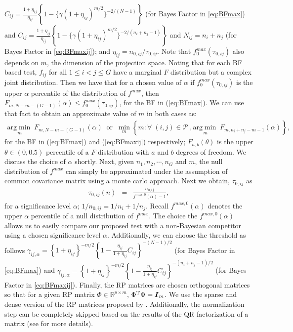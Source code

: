 \documentclass[12pt]{article}
\theoremstyle{plain}%
\theoremstyle{definition}
\def\be{\begin{eqnarray}}
\def\ee{\end{eqnarray}}
\def\trans{^{\rm T}}
\newcommand{\uF}       {\mbox{\boldmath$F$}}
\newcommand{\uI}       {\mbox{\boldmath$I$}}
\begin{document}
$C_{ij} = \frac{1+\eta_{ij}}{\eta_{ij}}\left\{ 1 - \{\gamma(1+\eta_{ij})^{m/2} \}^{-2/(N-1)}  \right\}$ (for Bayes Factor in \ref{eq:BFmax}) and $C_{ij} = \frac{1+\eta_{ij}}{\eta_{ij}}\left\{ 1 - \{\gamma(1+\eta_{ij})^{m/2} \}^{-2/(n_i+n_j-1)}  \right\}$ and $N_{ij} = n_i +n_j$ (for Bayes Factor in \ref{eq:BFmaxij}); and $\eta_{ij} = n_{0,ij}/\tau_{0,ij}$. Note that $f^{max}_{0}(\tau_{0,ij})$ also depends on $m$, the dimension of the projection space. Noting that for each BF based test, $f_{ij}$ for all $1 \leq i < j \leq G$ have a marginal $F$ distribution but a complex joint distribution. Then we have that for a chosen value of $\alpha$ if $f^{max}_{0}(\tau_{0,ij})$ is the upper $\alpha$ percentile of the distribution of $f^{max}$, then $F_{m, N-m-(G-1)}(\alpha) \leq f^{max}_{0}(\tau_{0,ij})$, for the BF in (\ref{eq:BFmax}).  We can use that fact to obtain an approximate value of $m$ in both cases as:
\be
 \underset{m}{\mathrm{arg\min}}\; F_{m, N -m -(G-1)}(\alpha)\;\; \mbox{or}\;\; \underset{m}{\mathrm{\min}} \left\{m:\forall\;(i,j) \in\mathcal{P}\;,  \underset{m}{\mathrm{arg\min}}\; F_{m, n_i+n_j -m -1}(\alpha) \right\}, \label{eq:mval} 
 \ee
for the BF in (\ref{eq:BFmax}) and (\ref{eq:BFmaxij}) respectively; $F_{a, b}(\theta)$ is the upper $\theta \in (0, 0.5)$ percentile of a $F$ distribution with $a$ and $b$ degrees of freedom. We discuss the choice of $\alpha$ shortly.
Next, given $n_1,n_2, \cdots, n_{G}$ and $m$, the null distribution of $f^{max}$ can simply be approximated under the assumption of common covariance matrix using a monte carlo approach. Next we obtain, $\tau_{0,ij}$ as
\be
\tau_{0,ij}(n) &=& \frac{n_{0,ij}}{f^{max,0}(\alpha) - 1}, \label{eq:tau0}
\ee
for a significance level $\alpha$;  $1/n_{0,ij} = 1/n_{i} + 1/n_{j}$. Recall $f^{max,0}(\alpha)$ denotes the upper $\alpha$ percentile of a null distribution of $f^{max}$. The choice the $f^{max,0}(\alpha)$ allows us to easily compare our proposed test with a non-Bayesian competitor using a chosen significance level $\alpha$.
 Additionally, we can choose the threshold as follows $\gamma_{ij,\alpha} = \left\{ 1 + \eta_{ij}\right\}^{-m/2}\left\{ 1 - \frac{\eta_{ij}}{1 + \eta_{ij}} C_{ij} \right\}^{-(N -1)/2}$ (for Bayes Factor in \ref{eq:BFmax}) and  %
$\gamma_{ij,\alpha} = \left\{ 1 + \eta_{ij}\right\}^{-m/2}\left\{ 1 - \frac{\eta_{ij}}{1 + \eta_{ij}} C_{ij} \right\}^{-(n_i+n_j -1)/2}$ (for Bayes Factor in \ref{eq:BFmaxij}).
Finally, the RP matrices are chosen orthogonal matrices so that for a given RP matrix $\Phi \in \mathbb{R}^{p \times m}$,  $\Phi\trans\Phi = \uI_{m}$. We use the sparse and dense version of the RP matrices proposed by \cite{srivastava2014raptt}. Additionally, the normalization step can be completely skipped based on the results of the QR factorization of a matrix (see \citealp{zoh2018powerful} for more details).
\end{document}
